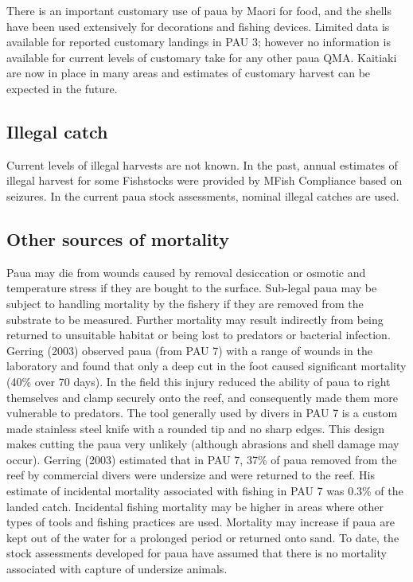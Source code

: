 \documentclass{mpi-plenary}
\theoremstyle{definition}
\theoremstyle{definition}
\theoremstyle{definition}
\theoremstyle{remark}
\begin{document}
There is an important customary use of paua by Maori for food, and the
shells have been used extensively for decorations and fishing devices.
Limited data is available for reported customary landings in PAU 3;
however no information is available for current levels of customary take
for any other paua QMA. Kaitiaki are now in place in many areas and
estimates of customary harvest can be expected in the future.

\subsection{Illegal catch}\label{illegal-catch}

Current levels of illegal harvests are not known. In the past, annual
estimates of illegal harvest for some Fishstocks were provided by MFish
Compliance based on seizures. In the current paua stock assessments,
nominal illegal catches are used.

\subsection{Other sources of
mortality}\label{other-sources-of-mortality}

Paua may die from wounds caused by removal desiccation or osmotic and
temperature stress if they are bought to the surface. Sub-legal paua may
be subject to handling mortality by the fishery if they are removed from
the substrate to be measured. Further mortality may result indirectly
from being returned to unsuitable habitat or being lost to predators or
bacterial infection. Gerring (2003) observed paua (from PAU 7) with a
range of wounds in the laboratory and found that only a deep cut in the
foot caused significant mortality (40\% over 70 days). In the field this
injury reduced the ability of paua to right themselves and clamp
securely onto the reef, and consequently made them more vulnerable to
predators. The tool generally used by divers in PAU 7 is a custom made
stainless steel knife with a rounded tip and no sharp edges. This design
makes cutting the paua very unlikely (although abrasions and shell
damage may occur). Gerring (2003) estimated that in PAU 7, 37\% of paua
removed from the reef by commercial divers were undersize and were
returned to the reef. His estimate of incidental mortality associated
with fishing in PAU 7 was 0.3\% of the landed catch. Incidental fishing
mortality may be higher in areas where other types of tools and fishing
practices are used. Mortality may increase if paua are kept out of the
water for a prolonged period or returned onto sand. To date, the stock
assessments developed for paua have assumed that there is no mortality
associated with capture of undersize animals.
\end{document}
